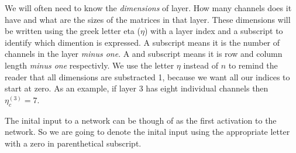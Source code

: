 We will often need to know the {\em dimensions} of layer.
How many channels does it have and what are the sizes of the matrices in that layer.
These dimensions will be written using the greek letter eta ($\eta$) with a layer index and a subscript to identify which dimention is expressed.
A  subscript means it is the number of channels in the layer {\em minus one}.
A  and  subscript means it is row and column length {\em minus one} respectivly.
We use the letter $\eta$ instead of $n$ to remind the reader that all dimensions are substracted 1, because we want all our indices to start at zero.
As an example, if layer $3$ has eight individual channels then $\eta^{(3)}_c = 7$.

The inital input to a network can be though of as the first activation to the network.
So we are going to denote the inital input using the appropriate  letter with a zero in parenthetical subscript.
\stopsubsubject


\startsubsection[title=Fully-connected layer]

\stopsubsection

\startsubsection[title=Convolutional layer]

\startsubsubsection[title=Where is the convolution?]
\stopsubsubsection
\stopsubsection

\startsubsection[title=Downsampling layer]

\stopsubsection

\startsubsection[title=The activation function]

\stopsubsection

\startsubsection[title=Output layer]

\stopsubsection